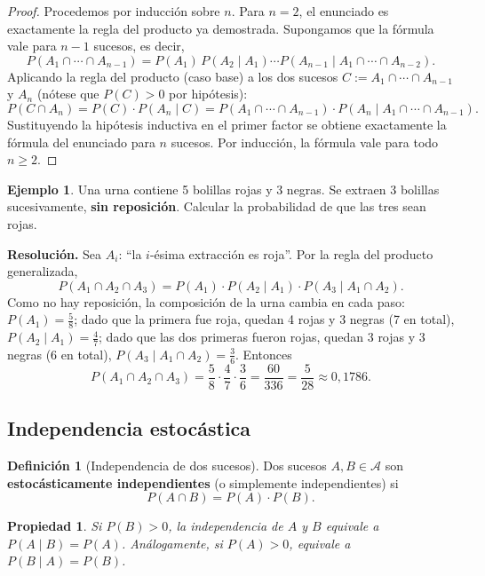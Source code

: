 \documentclass[11pt,a4paper]{article}
\theoremstyle{plain}
\newtheorem{propiedad}[teorema]{Propiedad}
\theoremstyle{definition}
\newtheorem{definicion}[teorema]{Definición}
\newtheorem{ejemplo}[teorema]{Ejemplo}
\theoremstyle{remark}
\begin{document}
\begin{proof}
Procedemos por inducción sobre $n$. Para $n=2$, el enunciado es exactamente la regla del producto ya demostrada. Supongamos que la fórmula vale para $n-1$ sucesos, es decir,
\[
P(A_1\cap\cdots\cap A_{n-1}) = P(A_1)\,P(A_2\mid A_1)\cdots P(A_{n-1}\mid A_1\cap\cdots\cap A_{n-2}).
\]
Aplicando la regla del producto (caso base) a los dos sucesos $C := A_1\cap\cdots\cap A_{n-1}$ y $A_n$ (nótese que $P(C)>0$ por hipótesis):
\[
P(C\cap A_n) = P(C)\cdot P(A_n\mid C) = P(A_1\cap\cdots\cap A_{n-1}) \cdot P(A_n\mid A_1\cap\cdots\cap A_{n-1}).
\]
Sustituyendo la hipótesis inductiva en el primer factor se obtiene exactamente la fórmula del enunciado para $n$ sucesos. Por inducción, la fórmula vale para todo $n\geq 2$.
\end{proof}

\begin{ejemplo}
Una urna contiene 5 bolillas rojas y 3 negras. Se extraen 3 bolillas sucesivamente, \textbf{sin reposición}. Calcular la probabilidad de que las tres sean rojas.
\end{ejemplo}

\textbf{Resolución.} Sea $A_i$: ``la $i$-ésima extracción es roja''. Por la regla del producto generalizada,
\[
P(A_1\cap A_2\cap A_3) = P(A_1)\cdot P(A_2\mid A_1)\cdot P(A_3\mid A_1\cap A_2).
\]
Como no hay reposición, la composición de la urna cambia en cada paso: $P(A_1) = \frac{5}{8}$; dado que la primera fue roja, quedan 4 rojas y 3 negras (7 en total), $P(A_2\mid A_1) = \frac{4}{7}$; dado que las dos primeras fueron rojas, quedan 3 rojas y 3 negras (6 en total), $P(A_3\mid A_1\cap A_2) = \frac{3}{6}$. Entonces
\[
P(A_1\cap A_2\cap A_3) = \frac{5}{8}\cdot\frac{4}{7}\cdot\frac{3}{6} = \frac{60}{336} = \frac{5}{28} \approx 0{,}1786.
\]

\subsection{Independencia estocástica}

\begin{definicion}[Independencia de dos sucesos]
Dos sucesos $A, B \in \mathcal{A}$ son \textbf{estocásticamente independientes} (o simplemente independientes) si
\[
P(A\cap B) = P(A)\cdot P(B).
\]
\end{definicion}

\begin{propiedad}
Si $P(B)>0$, la independencia de $A$ y $B$ equivale a $P(A\mid B) = P(A)$. Análogamente, si $P(A)>0$, equivale a $P(B\mid A)=P(B)$.
\end{propiedad}
\end{document}
